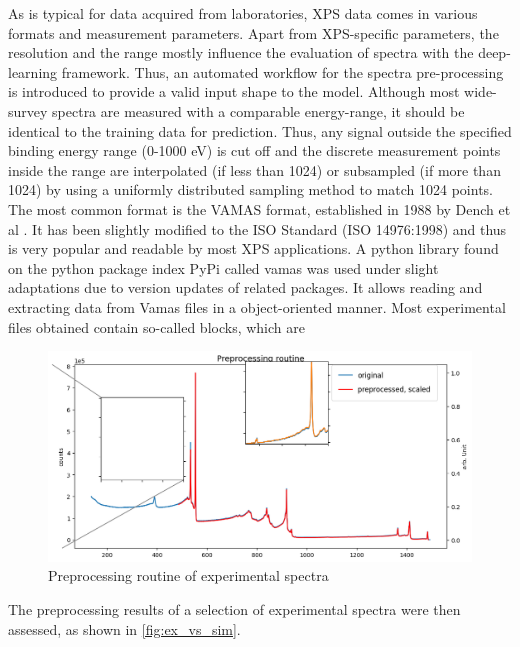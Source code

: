 As is typical for data acquired from laboratories, XPS data comes in various formats and measurement parameters. Apart from XPS-specific parameters, the resolution and the range mostly influence the evaluation of spectra with the deep-learning framework. Thus, an automated workflow for the spectra pre-processing is introduced to provide a valid input shape to the model.
Although most wide-survey spectra are measured with a comparable energy-range, it should be identical to the training data for prediction. Thus, any signal outside the specified binding energy range (0-1000 eV) is cut off and the discrete measurement points inside the range are interpolated (if less than 1024) or subsampled (if more than 1024) by using a uniformly distributed sampling method to match 1024 points.
The most common format is the VAMAS format, established in 1988 by Dench et al \cite{dench_vamas_1988}. It has been slightly modified to the ISO Standard \cite{1400-1700_iso_nodate}(ISO 14976:1998) and thus is very popular and readable by most XPS applications. A python library found on the python package index PyPi called vamas \cite{krinninger_vamas_nodate} was used under slight adaptations due to version updates of related packages. It allows reading and extracting data from Vamas files in a object-oriented manner.
Most experimental files obtained contain so-called blocks, which are 

\begin{figure}
    \centering
    \includegraphics[width=\textwidth]{Figures/preprocessing_routine.png}
    \caption{Preprocessing routine of experimental spectra}
    \label{fig:preproc_routine}
\end{figure}

The preprocessing results of a selection of experimental spectra were then assessed, as shown in \ref{fig:ex_vs_sim}.

